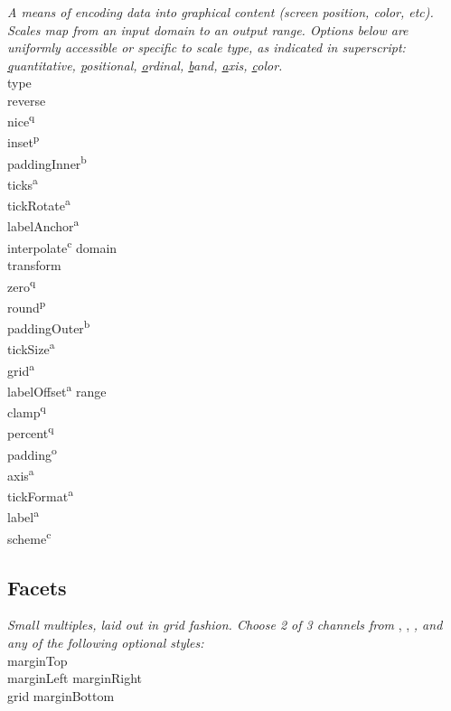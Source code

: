 \textit{A means of encoding data into graphical content (screen position, color, etc). Scales map from an input domain to an output range. Options below are uniformly accessible or specific to scale type, as indicated in superscript: \ul{q}uantitative, \ul{p}ositional, \ul{o}rdinal, \ul{b}and, \ul{a}xis, \ul{c}olor.}
\\
\api
{\widththree}{type \\ reverse \\ nice\textsuperscript{q} \\ inset\textsuperscript{p} \\ paddingInner\textsuperscript{b} \\ ticks\textsuperscript{a} \\ tickRotate\textsuperscript{a} \\ labelAnchor\textsuperscript{a} \\ interpolate\textsuperscript{c}}
{\widththree}{domain \\ transform \\ zero\textsuperscript{q} \\ round\textsuperscript{p} \\ paddingOuter\textsuperscript{b} \\ tickSize\textsuperscript{a} \\ grid\textsuperscript{a} \\ labelOffset\textsuperscript{a}}
{\widththree}{range \\ clamp\textsuperscript{q} \\ percent\textsuperscript{q} \\ padding\textsuperscript{o} \\ axis\textsuperscript{a} \\ tickFormat\textsuperscript{a} \\ label\textsuperscript{a} \\ scheme\textsuperscript{c} }
\stopapi

\subsection*{Facets}
\textit{Small multiples, laid out in grid fashion. Choose 2 of 3 channels from }, , \textit{, and any of the following optional styles:}\\
\api
{\widththree}{marginTop \\ marginLeft}
{\widththree}{marginRight \\ grid}
{\widththree}{marginBottom}
\stopapi


